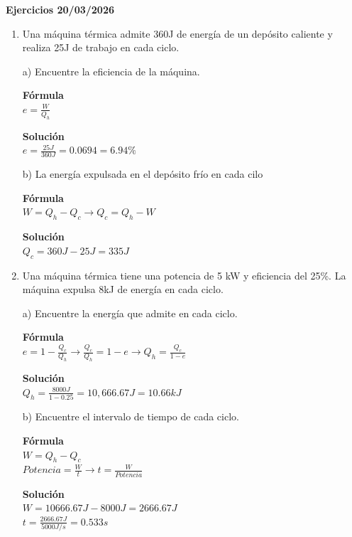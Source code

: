 \documentclass[a4paper, 11pt]{article}
\newcommand{\Pspace}{0.5cm}
\newcommand{\Aspace}{0.2cm}
\begin{document}
    \newpage
    {\Large \textbf{Ejercicios 20/03/2026}}
    \begin{enumerate}
    \vspace{\Pspace}
    \item Una máquina térmica admite 360J de energía de un depósito caliente y realiza 25J de trabajo en cada ciclo. \par
        \vspace{\Aspace} \par
        a) Encuentre la eficiencia de la máquina.
        \\ { \color{azul} 
            \textbf{Fórmula} \\
            $e = \frac{W}{Q_h}$ \par
            \textbf{Solución} \\
            $e = \frac{25 J}{360 J} = 0.0694 = 6.94\%$
        }

        \vspace{\Aspace} \par
        b) La energía expulsada en el depósito frío en cada cilo
        \\ { \color{azul} 
            \textbf{Fórmula} \\
            $W = Q_h - Q_c \rightarrow Q_c = Q_h - W$ \par
            \textbf{Solución} \\
            $Q_c = 360 J - 25 J = 335 J$
        }



    \vspace{\Pspace}
    \item Una máquina térmica tiene una potencia de 5 kW y eficiencia del 25\%. La máquina expulsa 8kJ de energía en cada ciclo. \par
        \vspace{\Aspace} \par
        a) Encuentre la energía que admite en cada ciclo.
        \\ { \color{azul} 
            \textbf{Fórmula} \\
            $e = 1 - \frac{Q_c}{Q_h} \rightarrow \frac{Q_c}{Q_h} = 1 - e \rightarrow Q_h = \frac{Q_c}{1 - e}$ \par
            \textbf{Solución} \\
            $Q_h = \frac{8000 J}{1 - 0.25} = 10,666.67 J = 10.66 kJ$
        }

        \vspace{\Aspace} \par
        b) Encuentre el intervalo de tiempo de cada ciclo.
        \\ { \color{azul} 
            \textbf{Fórmula} \\
            $W = Q_h - Q_c$ \\
            $Potencia = \frac{W}{t} \rightarrow t = \frac{W}{Potencia}$ \par
            \textbf{Solución} \\
            $W = 10666.67 J - 8000 J = 2666.67 J$ \\
            $t = \frac{2666.67 J}{5000 J/s} = 0.533 s$
        }




\end{enumerate}
\end{document}
